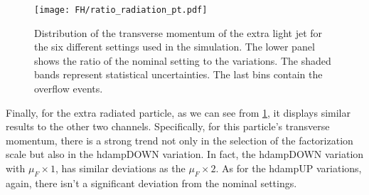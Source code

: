 \begin{figure}[H]
    \centering
    \texttt{[image: FH/ratio\_radiation\_pt.pdf]}
    \caption{Distribution of the transverse momentum of the extra light jet for the six different settings used in the simulation. The lower panel shows the ratio of the nominal setting to the variations. The shaded bands represent statistical uncertainties. The last bins contain the overflow events.}
    \label{fig:radiation_FH}
\end{figure}
\indent Finally, for the extra radiated particle, as we can see from \ref{fig:radiation_FH}, it displays similar results to the other two channels. Specifically, for this particle's transverse momentum, there is a strong trend not only in the selection of the factorization scale but also in the hdampDOWN variation. In fact, the hdampDOWN variation with $\mu_F \times 1$, has similar deviations as the $\mu_F \times 2$. As for the hdampUP variations, again, there isn't a significant deviation from the nominal settings. 

